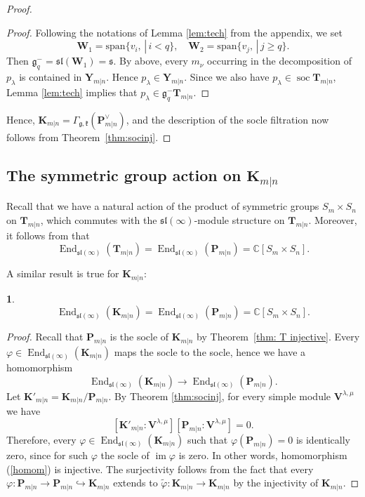 \documentclass[12pt,oneside,english]{amsart}
\numberwithin{equation}{section}
\numberwithin{figure}{section}
\theoremstyle{plain}
\theoremstyle{plain}
\theoremstyle{remark}
\theoremstyle{definition}
\theoremstyle{plain}
\theoremstyle{remark}
\theoremstyle{definition}
\theoremstyle{plain}
\theoremstyle{plain}
\newtheorem{prop}[thm]{\protect\propositionname}
\theoremstyle{definition}
\providecommand{\propositionname}{Proposition}
\newcommand{\bT}{\mathbf{T}}
\newcommand{\bP}{\mathbf{P}}
\newcommand{\bV}{\mathbf{V}}
\newcommand{\bK}{\mathbf{K}}
\newcommand{\bY}{\mathbf{Y}}
\newcommand{\bbW}{\mathbf{W}}
\newcommand{\soc}{\operatorname{soc}}
\newcommand{\fg}{\mathfrak{g}}
\newcommand{\fk}{\mathfrak{k}}
\newcommand{\fs}{\mathfrak{s}}
\begin{document}
\begin{proof}
\begin{proof}
    Following the notations of Lemma \ref{lem:tech} from the appendix, we set $$\bbW_1=\mathrm{span}\{v_i,\,|\,i<q\},\quad \bbW_2=\mathrm{span}\{v_j,\,|\,j\geq q\}.$$
    Then $\fg^-_q=\mathfrak{sl}(\bbW_1)=\fs$. By above, every $m_{\nu}$ occurring in the decomposition of $p_\lambda$ is contained in $\bY_{m|n}$. Hence
    $p_\lambda\in\bY_{m|n}$. Since we also have $p_\lambda\in\soc \bT_{m|n}$, Lemma \ref{lem:tech} implies that $p_\lambda\in\mathfrak{g}_{q}^-\bT_{m|n}$.
\end{proof}
Hence, $\bK_{m|n}=\Gamma_{\fg,\fk}(\bP_{m|n}^\vee)$, and the description of the socle filtration now follows from Theorem~\ref{thm:socinj}.
\end{proof}

\subsection{The symmetric group action on $\bK_{m|n}$}
Recall that we have a natural action of the product of symmetric groups $S_m\times S_n$ on $\bT_{m|n}$, which commutes with the $\mathfrak{sl}(\infty)$-module structure on $\bT_{m|n}$. Moreover, it follows from
\cite[Sect. 6]{DPS} that
\begin{equation}\label{endsym}
  \operatorname{End}_{\mathfrak{sl}(\infty)}(\bT_{m|n})=\operatorname{End}_{\mathfrak{sl}(\infty)}(\bP_{m|n})=\mathbb C[S_m\times S_n].
\end{equation}

A similar result is true for $\bK_{m|n}$:
\begin{prop}\label{end}
  $$\operatorname{End}_{\mathfrak{sl}(\infty)}(\bK_{m|n})=\operatorname{End}_{\mathfrak{sl}(\infty)}(\bP_{m|n})=\mathbb C[S_m\times S_n].$$
\end{prop}
\begin{proof} Recall that $\bP_{m|n}$ is the socle of $\bK_{m|n}$ by Theorem~\ref{thm: T injective}.  Every $\varphi\in \operatorname{End}_{\mathfrak{sl}(\infty)}(\bK_{m|n})$ maps the socle to the socle, hence we have a homomorphism
  \begin{equation}\label{homom} \operatorname{End}_{\mathfrak{sl}(\infty)}(\bK_{m|n})\to\operatorname{End}_{\mathfrak{sl}(\infty)}(\bP_{m|n}).\end{equation}
Let $\bK'_{m|n}=\bK_{m|n}/\bP_{m|n}$. By Theorem \ref{thm:socinj}, for every simple module
  $\bV^{\lambda,\mu}$ we have
  $$[\bK'_{m|n}:\bV^{\lambda,\mu}][\bP_{m|n}:\bV^{\lambda,\mu}]=0.$$
  Therefore,  every $\varphi\in
  \operatorname{End}_{\mathfrak{sl}(\infty)}(\bK_{m|n})$ such that
  $\varphi(\bP_{m|n})=0$ is identically zero,  since for such $\varphi$ the socle of $\operatorname{im} \varphi$ is zero. In other words,
  homomorphism (\ref{homom}) is injective. The surjectivity follows from the fact that every
  $\varphi:\bP_{m|n}\to \bP_{m|n}\hookrightarrow\bK_{m|n}$ extends to $\tilde\varphi:\bK_{m|n}\to\bK_{m|n}$ by the injectivity of $\bK_{m|n}$.
  \end{proof}
\end{document}
